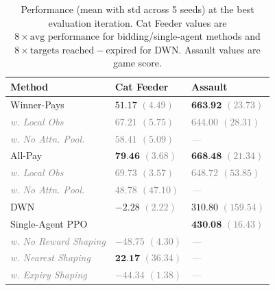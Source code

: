 \begin{table}
  \centering
  \caption{Performance (mean with std across 5 seeds) at the best evaluation iteration. Cat Feeder values are $8 \times \text{avg performance}$ for bidding/single-agent methods and $8 \times \text{targets reached} - \text{expired}$ for DWN. Assault values are game score.}
  \begin{tabular}{lll}
    \toprule
    {\bf Method} & {\bf Cat Feeder} & {\bf Assault} \\
    \midrule
    Winner-Pays & $51.17$ {\small\textcolor{gray}{$(4.49)$}} & $\textbf{663.92}$ {\small\textcolor{gray}{$(23.73)$}} \\
    \textcolor{gray}{\itshape\hspace{1em}w. Local Obs} & \textcolor{gray}{\itshape $67.21$ {\small$(5.75)$}} & \textcolor{gray}{\itshape $644.00$ {\small$(28.31)$}} \\
    \textcolor{gray}{\itshape\hspace{1em}w. No Attn. Pool.} & \textcolor{gray}{\itshape $58.41$ {\small$(5.09)$}} & \textcolor{gray}{\itshape ---} \\
    All-Pay & $\textbf{79.46}$ {\small\textcolor{gray}{$(3.68)$}} & $\textbf{668.48}$ {\small\textcolor{gray}{$(21.34)$}} \\
    \textcolor{gray}{\itshape\hspace{1em}w. Local Obs} & \textcolor{gray}{\itshape $69.73$ {\small$(3.57)$}} & \textcolor{gray}{\itshape $648.72$ {\small$(53.85)$}} \\
    \textcolor{gray}{\itshape\hspace{1em}w. No Attn. Pool.} & \textcolor{gray}{\itshape $48.78$ {\small$(47.10)$}} & \textcolor{gray}{\itshape ---} \\
    \midrule
    DWN & $-2.28$ {\small\textcolor{gray}{$(2.22)$}} & $310.80$ {\small\textcolor{gray}{$(159.54)$}} \\
    Single-Agent PPO & & $\textbf{430.08}$ {\small\textcolor{gray}{$(16.43)$}} \\
    \textcolor{gray}{\itshape\hspace{1em}w. No Reward Shaping} & \textcolor{gray}{\itshape $-48.75$ {\small$(4.30)$}} & \textcolor{gray}{\itshape ---} \\
    \textcolor{gray}{\itshape\hspace{1em}w. Nearest Shaping} & $\textbf{22.17}$ {\small\textcolor{gray}{$(36.34)$}} & \textcolor{gray}{\itshape ---} \\
    \textcolor{gray}{\itshape\hspace{1em}w. Expiry Shaping} & \textcolor{gray}{\itshape $-44.34$ {\small$(1.38)$}} & \textcolor{gray}{\itshape ---} \\
    \bottomrule
  \end{tabular}
  \label{tab:all_methods_comp}
\end{table}
